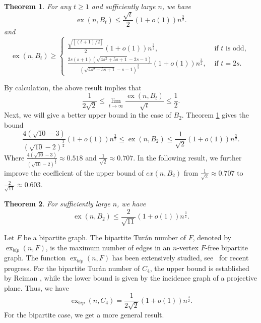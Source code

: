 \documentclass[11pt,a4paper]{article}
\newtheorem{theorem}{Theorem}[section]
\theoremstyle{definition}
\newcommand{\floor}[1]{\left\lfloor #1 \right\rfloor}
\DeclareMathOperator{\ex}{ex}
\begin{document}
        \begin{theorem}\label{upper bound of Bt}
        For any $t\ge 1$ and sufficiently large $n$, we have
            \begin{equation*}
                \ex(n, B_t) \leq \frac{\sqrt{t}}{2} (1 + o(1)) n^{\frac{3}{2}}.
            \end{equation*}
            and
            \begin{equation*}
                \ex(n, B_t) \geq 
                \begin{cases*}
                    \frac{\sqrt{\floor{(t+1)/2}}}{2} (1 + o(1)) n^{\frac{3}{2}}, &\text{ if $t$ is odd, }\\
                     \frac{2s(s+1)(\sqrt{4s^2+5s+1}-2s-1)}{(\sqrt{4s^2+5s+1}-s-1)^{\frac{3}{2}}}(1+o(1))n^{\frac{3}{2}}, &\text{ if $t=2s$. }
                \end{cases*}
            \end{equation*}
        \end{theorem}
        By calculation, the above result implies that
        $$\frac{1}{2\sqrt{2}}\leq \lim_{t\to \infty} \frac{\ex(n,B_t)}{\sqrt{t}}\leq \frac{1}{2}.$$
        Next, we will give a better upper bound in the case of $B_2$.
        Theorem \ref{upper bound of Bt} gives the bound 
        $$  \frac{4(\sqrt{10}-3)}{(\sqrt{10}-2)^{\frac{3}{2}}} (1+o(1))n^{\frac{3}{2}} \leq \ex(n, B_2) \leq \frac{1}{\sqrt{2}}(1+o(1))n^{\frac{3}{2}}.$$
        Where $\frac{4(\sqrt{10}-3)}{(\sqrt{10}-2)^{\frac{3}{2}}}\approx 0.518$ and $\frac{1}{\sqrt{2}}\approx 0.707$.
        In the following result, we further improve the coefficient of the upper bound of $ex(n,B_2)$ from $\frac{1}{\sqrt{2}}\approx 0.707$ to $\frac{2}{\sqrt{11}}\approx 0.603$.
        \begin{theorem}\label{thm: upper and lower bound of B2}
        For sufficiently large $n$, we have
            $$\ex(n,B_2)\leq \frac{2}{\sqrt{11}} (1+o(1)) n^{\frac{3}{2}}.$$
        \end{theorem}

        Let $F$ be a bipartite graph.
        The bipartite Tur\'{a}n number of $F$, denoted by $\ex_{bip} (n, F)$, is the maximum number of edges in an $n$-vertex $F$-free bipartite graph.
        The function $\ex_{bip} (n, F)$ has been extensively studied, see~\cite{AlonTuran2003, SudakovTuran2020, YuanExtre2024} for recent progress.
        For the bipartite Tur\'{a}n number of $C_4$, the upper bound is established by Reiman \cite{ReimanUber1958}, while the lower bound is given by the incidence graph of a projective plane.     
        Thus, we have
        \begin{equation*}
            \ex_{bip}(n,C_4) = \frac{1}{2\sqrt{2}}(1+o(1))n^{\frac{3}{2}}.
        \end{equation*}
        For the bipartite case, we get a more general result.
\end{document}
